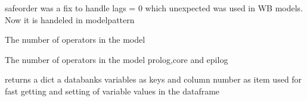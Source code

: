 \documentclass[letterpaper,10pt,english]{sphinxmanual}
\begin{document}
\begin{fulllineitems}
\begin{fulllineitems}
\sphinxAtStartPar
safeorder was a fix to handle lags = \sphinxhyphen{}0 which unexpected was used in WB models. Now it is handeled in modelpattern

\end{fulllineitems}


\begin{fulllineitems}
\label{\detokenize{core/modelclass:modelclass.BaseModel.calculate_freq}}
\pysigstartsignatures
{}
\pysigstopsignatures
\sphinxAtStartPar
The number of operators in the model

\end{fulllineitems}


\begin{fulllineitems}
\label{\detokenize{core/modelclass:modelclass.BaseModel.flop_get}}
\pysigstartsignatures
{}
\pysigstopsignatures
\sphinxAtStartPar
The number of operators in the model prolog,core and epilog

\end{fulllineitems}


\begin{fulllineitems}
\label{\detokenize{core/modelclass:modelclass.BaseModel.calculate_freq_list}}
\pysigstartsignatures
{}
\pysigstopsignatures
\end{fulllineitems}


\begin{fulllineitems}
\label{\detokenize{core/modelclass:modelclass.BaseModel.get_columnsnr}}
\pysigstartsignatures
{}
\pysigstopsignatures
\sphinxAtStartPar
returns a dict a databanks variables as keys and column number as item
used for fast getting and setting of variable values in the dataframe


\end{fulllineitems}
\end{fulllineitems}
\end{document}
